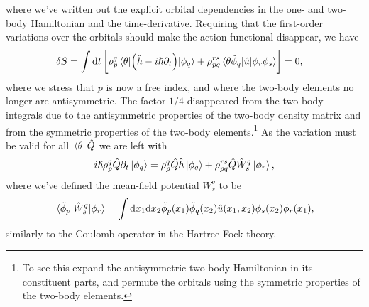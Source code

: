             where we've written out the explicit orbital dependencies in the
            one- and two-body Hamiltonian and the time-derivative.
            Requiring that the first-order variations over the orbitals should
            make the action functional disappear, we have
            \begin{align}
                \delta S
                &=
                \int\dd t \left[ 
                    \rho^{q}_{p}
                    \mel*{\theta}{
                        \left( 
                            \hat{h}
                            - i\hslash\partial_t
                         \right)
                    }{\phi_q}
                    +
                    \rho^{rs}_{pq}
                    \mel*{\theta\tilde{\phi}_q}{
                        \hat{u}
                    }{\phi_r\phi_s}
                 \right]
                = 0,
            \end{align}
            where we stress that $p$ is now a free index, and where the two-body
            elements no longer are antisymmetric.
            The factor $1/4$ disappeared from the two-body integrals due to the
            antisymmetric properties of the two-body density matrix and from the
            symmetric properties of the two-body elements.\footnote{%
                To see this expand the antisymmetric two-body Hamiltonian in its
                constituent parts, and permute the orbitals using the symmetric
                properties of the two-body elements.
            }
            As the variation must be valid for all $\bra*{\theta}\hat{Q}$ we are
            left with
            \begin{align}
                i\hslash\rho^{q}_{p}\hat{Q}\partial_t\ket*{\phi_q}
                = \rho^{q}_{p}\hat{Q}\hat{h}\ket*{\phi_q}
                + \rho^{rs}_{pq}\hat{Q}\hat{W}^{q}_{s}\ket*{\phi_{r}},
                \label{eq:ket-q}
            \end{align}
            where we've defined the mean-field potential $W^{q}_{s}$ to be
            \cite{kvaal2012ab}
            \begin{align}
                \mel*{\tilde{\phi}_p}{
                    \hat{W}^{q}_{s}
                }{\phi_r}
                = \int\dd x_1 \dd x_2
                \tilde{\phi}_{p}(x_1)
                \tilde{\phi}_{q}(x_2)
                \hat{u}(x_1, x_2)
                \phi_s(x_2)
                \phi_r(x_1),
            \end{align}
            similarly to the Coulomb operator in the Hartree-Fock theory.
